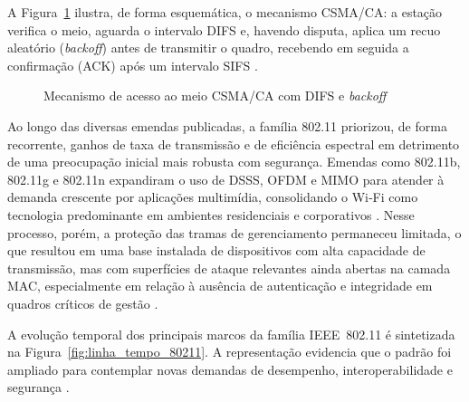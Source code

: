 A Figura~\ref{fig:csma_ca} ilustra, de forma esquemática, o mecanismo CSMA/CA: a estação verifica o meio, aguarda o intervalo DIFS e, havendo disputa, aplica um recuo aleatório (\textit{backoff}) antes de transmitir o quadro, recebendo em seguida a confirmação (ACK) após um intervalo SIFS \cite{Hiertz2010}.

\begin{figure}[htb]
\centering
\caption{Mecanismo de acesso ao meio CSMA/CA com DIFS e \textit{backoff}}
\label{fig:csma_ca}
\end{figure}

Ao longo das diversas emendas publicadas, a família 802.11 priorizou, de forma recorrente, ganhos de taxa de transmissão e de eficiência espectral em detrimento de uma preocupação inicial mais robusta com segurança. Emendas como 802.11b, 802.11g e 802.11n expandiram o uso de DSSS, OFDM e MIMO para atender à demanda crescente por aplicações multimídia, consolidando o Wi‑Fi como tecnologia predominante em ambientes residenciais e corporativos \cite{Hiertz2010}. Nesse processo, porém, a proteção das tramas de gerenciamento permaneceu limitada, o que resultou em uma base instalada de dispositivos com alta capacidade de transmissão, mas com superfícies de ataque relevantes ainda abertas na camada MAC, especialmente em relação à ausência de autenticação e integridade em quadros críticos de gestão \cite{KohliosHayajneh2018}.

A evolução temporal dos principais marcos da família IEEE~802.11 é sintetizada na Figura~\ref{fig:linha_tempo_80211}. A representação evidencia que o padrão foi ampliado para contemplar novas demandas de desempenho, interoperabilidade e segurança \cite{Hiertz2010}.

